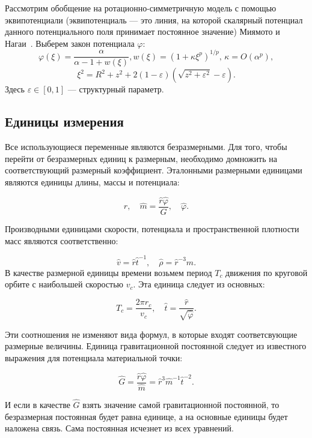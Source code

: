 Рассмотрим обобщение на ротационно-симметричную модель с помощью эквипотенциали (эквипотенциаль --- это линия, на которой скалярный потенциал данного потенциального поля принимает постоянное значение) Миямото и Нагаи~\cite{MiamotoNagai}. Выберем закон потенциала $\varphi:$\\

\begin{equation}\label{eq:xi}
        \varphi (\xi ) =  \frac{\alpha}{\alpha - 1 + w(\xi )} \text{,}\, w(\xi ) = (1 + \kappa \xi ^p)^{1/p},\, \kappa = O(\alpha ^p),
\end{equation}
\begin{equation}
        \xi ^2 = R^2 + z^2 + 2(1 - \varepsilon)(\sqrt{z^2 + \varepsilon ^2} - \varepsilon).
\end{equation}
Здесь $\varepsilon \in [0,1] $ --- структурный параметр.

\subsection{Единицы измерения}

Все использующиеся переменные являются безразмерными. Для того, чтобы перейти от безразмерных единиц к размерным, необходимо домножить на соответствующий размерный коэффициент. Эталонными размерными единицами являются единицы длины, массы и потенциала:

$$
\widehat{r}, \quad 
\widehat{m} = \frac{\widehat{r}\widehat{\varphi}}{G}, \quad 
\widehat{\varphi}.
$$

Производными единицами скорости, потенциала и пространственной плотности масс являются соответственно:

$$
\widehat{v} = \widehat{r}\widehat{t}^{-1}, \quad
\widehat{\rho} = \widehat{r}^{-3}\widehat{m}.
$$
В качестве размерной единицы времени возьмем период $T_c$ движения по круговой орбите с наибольшей скоростью $v_c$. Эта единица следует из основных:

$$
T_c = \frac{2\pi r_c}{v_c}, \quad \widehat{t} = \frac{\widehat{r}}{\sqrt{\widehat{\varphi}}}.
$$

Эти соотношения не изменяют вида формул, в которые входят соответсвующие размерные величины. Единица гравитационной постоянной следует из известного выражения для потенциала материальной точки:

$$
\widehat{G} = \frac{\widehat{r}\widehat{\varphi}}{\widehat{m}} = \widehat{r}^3\widehat{m}^{-1}\widehat{t}^{-2}.
$$

И если в качестве $\widehat{G}$ взять значение самой гравитационной постоянной, то безразмерная постоянная будет равна единице, а на основные единицы будет наложена связь. Сама постоянная исчезнет из всех уравнений.\\



